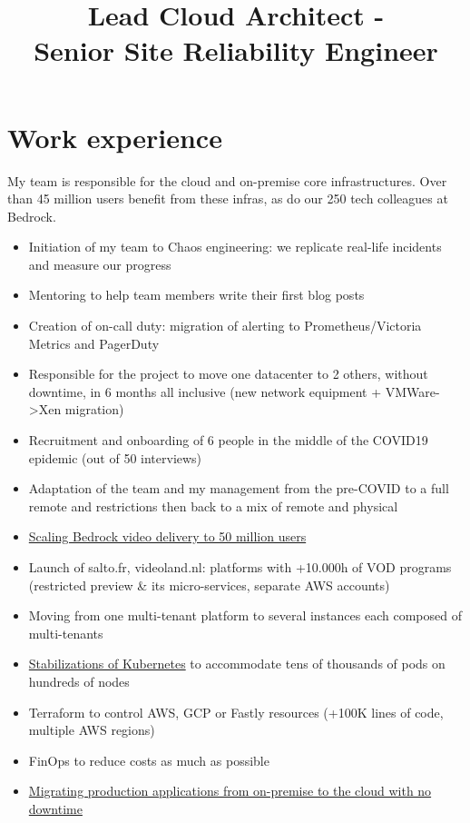 \documentclass[12pt,a4paper,roman]{moderncv}          %
\title{Lead Cloud Architect -\\
Senior Site Reliability Engineer}
\begin{document}
\makecvtitle


\section{Work experience}

{My team is responsible for the cloud and on-premise core infrastructures. Over than 45 million users benefit from these infras, as do our 250 tech colleagues at Bedrock.
\begin{itemize}
  \item Initiation of my team to Chaos engineering: we replicate real-life incidents and measure our progress
  \item Mentoring to help team members write their first blog posts
  \item Creation of on-call duty: migration of alerting to Prometheus/Victoria Metrics and PagerDuty
  \item Responsible for the project to move one datacenter to 2 others, without downtime, in 6 months all inclusive (new network equipment + VMWare->Xen migration)
  \item Recruitment and onboarding of 6 people in the middle of the COVID19 epidemic (out of 50 interviews)
  \item Adaptation of the team and my management from the pre-COVID to a full remote and restrictions then back to a mix of remote and physical
  \item \href{https://tech.bedrockstreaming.com/scaling-bedrock-video-delivery-to-50-million-users/}{\color{blue}Scaling Bedrock video delivery to 50 million users}
  \item Launch of salto.fr, videoland.nl: platforms with +10.000h of VOD programs (restricted preview \& its micro-services, separate AWS accounts)
  \item Moving from one multi-tenant platform to several instances each composed of multi-tenants
  \item \href{https://tech.bedrockstreaming.com/Three-years-running-kubernetes-on-production-at-Bedrock/}{\color{blue}Stabilizations of Kubernetes} to accommodate tens of thousands of pods on hundreds of nodes
  \item Terraform to control AWS, GCP or Fastly resources (+100K lines of code, multiple AWS regions)
  \item FinOps to reduce costs as much as possible
  \item \href{https://tech.bedrockstreaming.com/Migrating-production-apps-from-on-premise-to-the-cloud-with-no-downtime/}{\color{blue}Migrating production applications from on-premise to the cloud with no downtime}
\end{itemize}}
\end{document}
